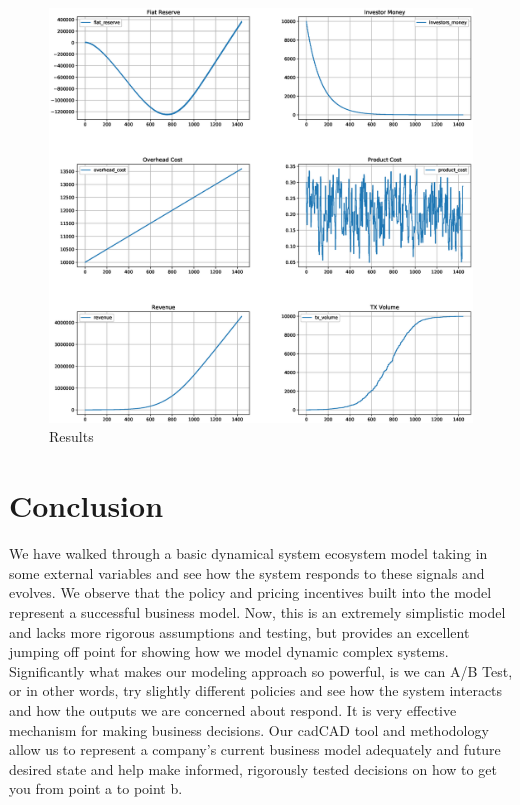 \documentclass[12pt]{extarticle}
\begin{document}
\begin{figure}[h]
    \centering
    \includegraphics[width=1\textwidth]{images/Results.eps}
    \caption{Results}
    \label{fig:results}
\end{figure}


\section{Conclusion}
We have walked through a basic dynamical system ecosystem model taking in some external variables and see how the system responds to these signals and evolves. We observe that the policy and pricing incentives built into the model represent a successful business model. Now, this is an extremely simplistic model and lacks more rigorous assumptions and testing, but provides an excellent jumping off point for showing how we model dynamic complex systems. Significantly what makes our modeling approach so powerful, is we can A/B Test, or in other words, try slightly different policies and see how the system interacts and how the outputs we are concerned about respond. It is very effective mechanism for making business decisions. Our cadCAD tool and methodology allow us to represent a company's current business model adequately and future desired state and help make informed, rigorously tested decisions on how to get you from point a to point b.
\end{document}
